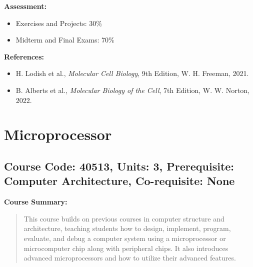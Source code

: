 \documentclass[12pt]{article}
\begin{document}
\textbf{Assessment:}
\begin{itemize}
    \item Exercises and Projects: 30\%
    \item Midterm and Final Exams: 70\%
\end{itemize}

\textbf{References:}
\begin{itemize}
    \item H. Lodish et al., \textit{Molecular Cell Biology}, 9th Edition, W. H. Freeman, 2021.
    \item B. Alberts et al., \textit{Molecular Biology of the Cell}, 7th Edition, W. W. Norton, 2022.
\end{itemize}

\newpage

\section{Microprocessor}
\subsection*{Course Code: 40513, Units: 3, Prerequisite: Computer Architecture, Co-requisite: None}

\textbf{Course Summary:} 
\begin{quote}
This course builds on previous courses in computer structure and architecture, teaching students how to design, implement, program, evaluate, and debug a computer system using a microprocessor or microcomputer chip along with peripheral chips. It also introduces advanced microprocessors and how to utilize their advanced features.
\end{quote}
\end{document}
